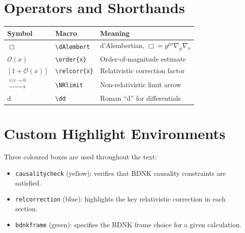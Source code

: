 \documentclass[12pt]{book}
\def\textbf#1{#1}%
\newcommand{\dAlembert}{\Box}
\newcommand{\order}[1]{\mathcal{O}(#1)}
\providecommand{\dd}{\mathrm{d}}
\newcommand{\relcorr}[1]{\left[1 + \order{#1}\right]}
\newcommand{\NRlimit}{\xrightarrow{v/c \to 0}}
\begin{document}
\section*{Operators and Shorthands}

\begin{center}
\renewcommand{\arraystretch}{1.25}
\begin{tabular}{@{}lll@{}}
\toprule
\textbf{Symbol} & \textbf{Macro} & \textbf{Meaning} \\
\midrule
$\Box$            & \verb|\dAlembert|  & d'Alembertian, $\Box = g^{\mu\nu}\nabla_\mu\nabla_\nu$ \\
$\mathcal{O}(x)$  & \verb|\order{x}|  & Order-of-magnitude estimate \\
$[1 + \mathcal{O}(x)]$ & \verb|\relcorr{x}| & Relativistic correction factor \\
$\xrightarrow{v/c \to 0}$ & \verb|\NRlimit| & Non-relativistic limit arrow \\
$\mathrm{d}$      & \verb|\dd|        & Roman ``d'' for differentials \\
\bottomrule
\end{tabular}
\end{center}

\section*{Custom Highlight Environments}

Three coloured boxes are used throughout the text:
\begin{itemize}
\item \texttt{causalitycheck} (yellow): verifies that BDNK causality constraints are satisfied.
\item \texttt{relcorrection} (blue): highlights the key relativistic correction in each section.
\item \texttt{bdnkframe} (green): specifies the BDNK frame choice for a given calculation.
\end{itemize}


\tableofcontents

\mainmatter

\end{document}
